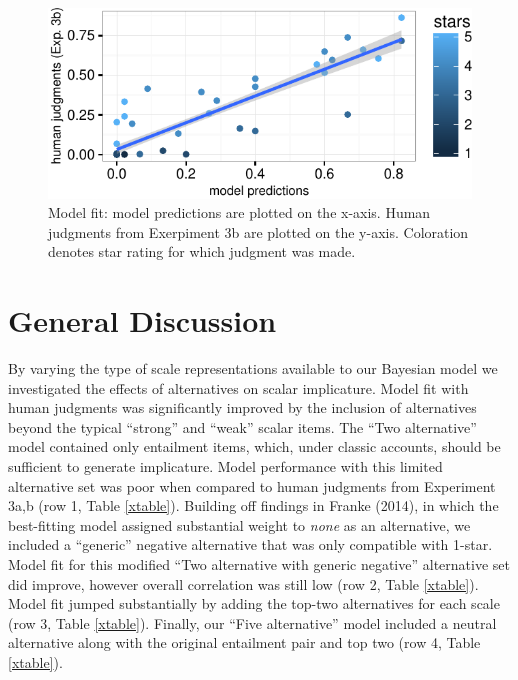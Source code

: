 \documentclass[10pt, letterpaper]{article}
\newenvironment{CodeChunk}{}{}
\begin{document}
\begin{CodeChunk}
\begin{figure}[t]

{\centering \includegraphics{figs/fiveAltsScatter-1} 

}

\caption[Model fit]{Model fit: model predictions are plotted on the x-axis. Human judgments from Exerpiment 3b are plotted on the y-axis. Coloration denotes star rating for which judgment was made.}\label{fig:fiveAltsScatter}
\end{figure}
\end{CodeChunk}

\section{General Discussion}\label{general-discussion}

By varying the type of scale representations available to our Bayesian
model we investigated the effects of alternatives on scalar implicature.
Model fit with human judgments was significantly improved by the
inclusion of alternatives beyond the typical ``strong'' and ``weak''
scalar items. The ``Two alternative'' model contained only entailment
items, which, under classic accounts, should be sufficient to generate
implicature. Model performance with this limited alternative set was
poor when compared to human judgments from Experiment 3a,b (row 1, Table
\ref{xtable}). Building off findings in Franke (2014), in which the
best-fitting model assigned substantial weight to \emph{none} as an
alternative, we included a ``generic'' negative alternative that was
only compatible with 1-star. Model fit for this modified ``Two
alternative with generic negative'' alternative set did improve, however
overall correlation was still low (row 2, Table \ref{xtable}). Model fit
jumped substantially by adding the top-two alternatives for each scale
(row 3, Table \ref{xtable}). Finally, our ``Five alternative'' model
included a neutral alternative along with the original entailment pair
and top two (row 4, Table \ref{xtable}).
\end{document}
